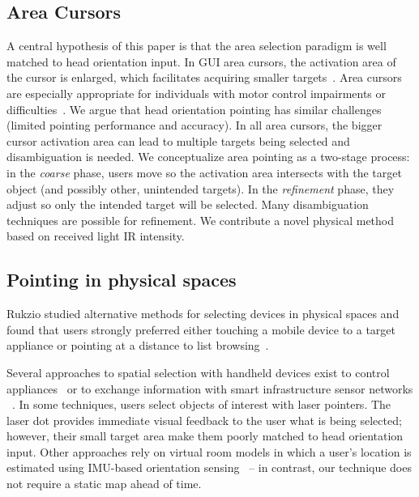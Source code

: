 \subsection{Area Cursors}
A central hypothesis of this paper is that the area selection paradigm is well matched to head orientation input. In GUI area cursors, the activation area of the cursor is enlarged, which facilitates acquiring smaller targets~\cite{kabbash1995prince}. Area cursors are especially appropriate for individuals with motor control impairments or difficulties~\cite{worden1997making,findlater2010enhanced}. We argue that head orientation pointing has similar challenges (limited pointing performance and accuracy). In all area cursors, the bigger cursor activation area can lead to multiple targets being selected and disambiguation is needed. 
We conceptualize area pointing as a two-stage process: in the {\em coarse} phase, users move so the activation area intersects with the target object (and possibly other, unintended targets). In the {\em refinement} phase, they adjust so only the intended target will be selected. Many disambiguation techniques are possible for refinement. We contribute a novel physical method based on received light IR intensity.

\subsection{Pointing in physical spaces}
Rukzio studied alternative methods for selecting devices in physical spaces and found that users strongly preferred either touching a mobile device to a target appliance or pointing at a distance to list browsing~\cite{rukzio_experimental_2006}.

Several approaches to spatial selection with handheld devices exist to control appliances~\cite{beigl_point_1999,patel_2-way_2003,wilson_xwand:_2003,schmidt_picontrol:_2012,kemp_point-and-click_2008} or to exchange information with smart infrastructure sensor networks ~\cite{lifton_tricorder:_2007,mittal_ubicorder:_2011,costanza_sensortune:_2010}. In some techniques, users select objects of interest with laser pointers. The laser dot provides immediate visual feedback to the user what is being selected; however, their small target area make them poorly matched to head orientation input.
Other approaches rely on virtual room models in which a user's location is estimated using IMU-based orientation sensing~\cite{wilson_xwand:_2003,lifton_tricorder:_2007} -- in contrast, our technique does not require a static map ahead of time.

